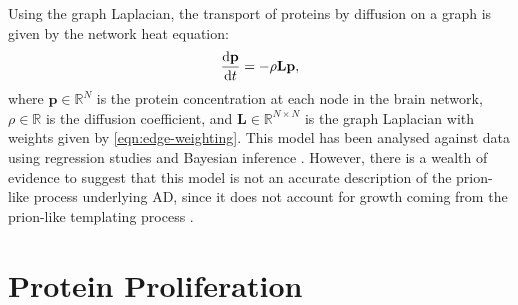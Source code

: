 Using the graph Laplacian, the transport of proteins by diffusion on a graph is
given by the network heat equation: 
\begin{equation}\label{eqn:ndmodel}
    \dfrac{\mathrm{d}\mathbf{p}}{\mathrm{d}t} = -\rho \mathbf{L}\mathbf{p},
\end{equation}
where $\mathbf{p} \in \mathbb{R}^{N}$ is the protein concentration at each node
in the brain network, $\rho \in \mathbb{R}$ is the diffusion coefficient, and
$\mathbf{L} \in \mathbb{R}^{N \times N}$ is the graph Laplacian with weights
given by \cref{eqn:edge-weighting}. This model has been analysed against
data using regression studies \cite{raj2012network,raj2015network} and Bayesian
inference \cite{schafer2020network}. However, there is a wealth of evidence to
suggest that this model is not an accurate description of the prion-like process
underlying AD, since it does not account for growth coming from the prion-like
templating process \cite{jucker2013self,fornari2019prion}.

\section{Protein Proliferation}
\label{sec:growth}
